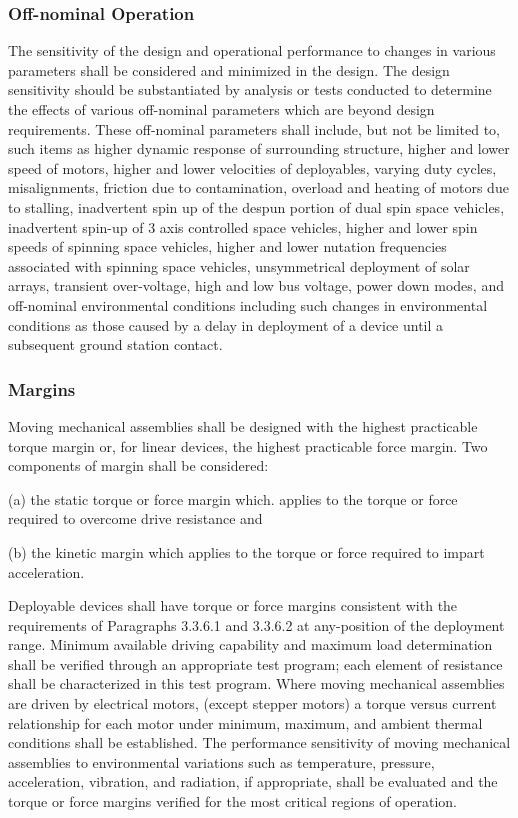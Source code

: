 \documentclass[12pt]{article}
\begin{document}
\subsubsection{Off-nominal Operation} %
The sensitivity of the design and operational performance to changes in various parameters shall be considered and minimized in the design. 
The design sensitivity should be substantiated by analysis or tests conducted to determine the effects of various off-nominal parameters which are beyond design requirements. 
These off-nominal parameters shall include, but not be limited to, such items as higher dynamic response of surrounding structure, higher and lower speed of motors, higher and lower velocities of deployables, varying duty cycles, misalignments, friction due to contamination, overload and heating of motors due to stalling, inadvertent spin up of the despun portion of dual spin space vehicles, inadvertent spin-up of 3 axis controlled space vehicles, higher and lower spin speeds of spinning space vehicles, higher and lower nutation frequencies associated with spinning space vehicles, unsymmetrical deployment of solar arrays, transient over-voltage, high and low bus voltage, power down modes, and off-nominal environmental conditions including such changes in environmental conditions as those caused by a delay in deployment of a device until a subsequent ground station contact.

\subsubsection{Margins} %
Moving mechanical assemblies shall be designed with the highest practicable torque margin or, for linear devices, the highest practicable force margin. 
Two components of margin shall be considered: 

(a) the static torque or force margin which. applies to the torque or force required to overcome drive resistance and 

(b) the kinetic margin which applies to the torque or force required to impart acceleration.

Deployable devices shall have torque or force margins consistent with the requirements of Paragraphs 3.3.6.1 and 3.3.6.2 at any-position of the deployment range. 
Minimum available driving capability and maximum load determination shall be verified through an appropriate test program; each element of resistance shall be characterized in this test program. 
Where moving mechanical assemblies are driven by electrical motors, (except stepper motors) a torque versus current relationship for each motor under minimum, maximum, and ambient thermal conditions shall be established. 
The performance sensitivity of moving mechanical assemblies to environmental variations such as temperature, pressure, acceleration, vibration, and radiation, if appropriate, shall be evaluated and the torque or force margins verified for the most critical regions of operation.
\end{document}
